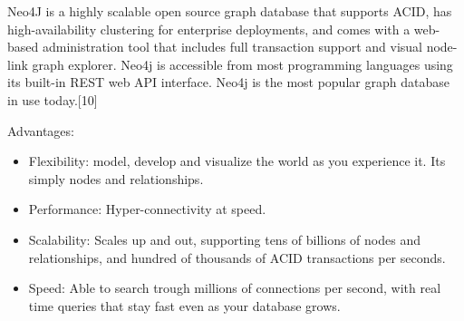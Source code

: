 Neo4J is a highly scalable open source graph database that supports ACID, has high-availability clustering for enterprise deployments, and comes with a web-based administration tool that includes full transaction support and visual node-link graph explorer. Neo4j is accessible from most programming languages using its built-in REST web API interface. Neo4j is the most popular graph database in use today.[10]

Advantages:
\begin{itemize} 
\item Flexibility: model, develop and visualize the world as you experience it. Its simply nodes and relationships. 
\item Performance: Hyper-connectivity at speed. 
\item Scalability: Scales up and out, supporting tens of billions of nodes and relationships, and hundred of thousands of ACID transactions per seconds. 
\item Speed: Able to search trough millions of connections per second, with real time queries that stay fast even as your database grows. 
\end{itemize}


